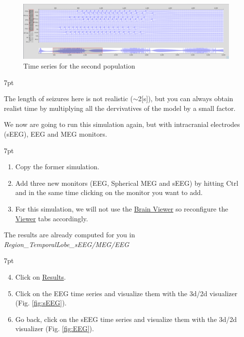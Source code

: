 \documentclass{tufte-handout}
\newenvironment{simulation}{%
  \def\FrameCommand{%
    \hspace{1pt}%
    {\color{ForestGreen}\vrule width 2pt}%
    {\color{simulationshade}\vrule width 4pt}%
    \colorbox{simulationshade}%
  }%
  \MakeFramed{\advance\hsize-\width\FrameRestore}%
  \noindent\hspace{-4.55pt}%
  \begin{adjustwidth}{}{7pt}%
  \vspace{2pt}\vspace{2pt}%
}
{%
  \vspace{2pt}\end{adjustwidth}\endMakeFramed%
}
\newenvironment{blah}{%
  \def\FrameCommand{%
    \hspace{1pt}%
    {\color{DarkOrange}\vrule width 2pt}%
    {\color{PeachPuff}\vrule width 4pt}%
    \colorbox{PeachPuff}%
  }%
  \MakeFramed{\advance\hsize-\width\FrameRestore}%
  \noindent\hspace{-4.55pt}%
  \begin{adjustwidth}{}{7pt}%
  \vspace{2pt}\vspace{2pt}%
}
{%
  \vspace{2pt}\end{adjustwidth}\endMakeFramed%
}
\begin{document}
\begin{figure}[h]
  \includegraphics[width=\linewidth]{Handout_UI_ModellingAnEpilepticPatient_SecondPopulationTimeSeries}%
  \caption{Time series for the second population}%
  \label{fig:second_pop}%
\end{figure}

\begin{blah}
  \begin{enumerate}[resume]
  The length of seizures here is not realistic ($\sim$\unit{2}[s]), but you can always obtain realist time by multiplying
  all the dervivatives of the model by a small factor.
  \end{enumerate}
\end{blah}
We now are going to run this simulation again, but with intracranial electrodes (sEEG), EEG and MEG monitors.

\begin{simulation}
  \begin{enumerate}
  \item Copy the former simulation.
  \item Add three new monitors (EEG, Spherical MEG and sEEG) by hitting Ctrl and in the same time clicking on the monitor
  you want to add.
  \item For this simulation, we will not use the \underline{Brain Viewer} so reconfigure the \underline{Viewer} tabs accordingly.
\end{enumerate}
\end{simulation}

The results are already computed for you in \textit{Region\_TemporalLobe\_sEEG/MEG/EEG}

\begin{simulation}
  \begin{enumerate}
    \setcounter{enumi}{3}
  \item Click on \underline{Results}.
  \item Click on the EEG time series and visualize them with the 3d/2d visualizer (Fig. \ref{fig:sEEG}).
  \item Go back, click on the sEEG time series and visualize them with the 3d/2d visualizer (Fig. \ref{fig:EEG}).
\end{enumerate}
\end{simulation}
\end{document}
